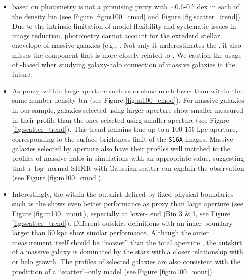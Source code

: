 \documentclass[a4paper,fleqn,usenatbib]{mnras}
\begin{document}
    \begin{itemize}

        \item \mstar{} based on \cmodel{} photometry is not a promising \mvir{} proxy with
            \sigmh{}$\sim 0.6$-0.7 dex in each of the density bin (see Figure \ref{fig:m100_cmod}
            and Figure \ref{fig:scatter_trend}).
            Due to the intrinsic limitation of model flexibility and systematic issues in
            image reduction, \cmodel{} photometry cannot account for the extedend stellar
            enevelope of massive galaxies (e.g., \citealt{Bernardi2013, Huang2018b}.
            Not only it underestimates the \mstar{}, it also misses the component that is
            more closely related to \mvir{}.
            We caution the usage of \cmodel{}-based \mstar{} when studying galaxy-halo
            connection of massive galaxies in the future.

        \item As \mvir{} proxy, \mstar{} within large aperture such as  or
             show much lower \sigmh{} than \mcmodel{} within the same number
            density bin (see Figure \ref{fig:m100_cmod}).
            For massive galaxies in our sample, galaxies selected using larger aperture \mstar{}
            show smaller \sigmh{} measured in their \dsigma{} profile than the ones
            selected using smaller aperture (see Figure \ref{fig:scatter_trend}).
            This trend remains true up to a 100-150 kpc aperture, corresponding to the
            surface brightness limit of the \texttt{S16A} images.
            Massive galaxies selected by aperture \mstar{} also have their \dsigma{}
            profiles well matched to the profiles of massive halos in simulations with an
            appropriate \sigmh{} value, suggesting that a $\log$-normal SHMR with Gaussian
            scatter can explain the observation (see Figure \ref{fig:m100_cmod}).

        \item Interestingly, the \mstar{} within the outskirt defined by fixed physical 
            boundaries such as the  shows even better performance as 
            \mvir{} proxy than large aperture \mstar{} (see Figure \ref{fig:m100_mout}),
            especially at lower-\mvir{} end (Bin 3 \& 4, see Figure \ref{fig:scatter_trend}).
            Different outskirt \mstar{} definitions with an inner boundary larger than 50 kpc
            show similar performance.
            Although the outer \mstar{} measurement itself should be ``noisier'' than the 
            total aperture \mstar{}, the outskirt of a massive galaxy is dominated by 
            the \exsitu{} stars with a closer relationship with \mvir{} or halo growth.
            The \dsigma{} profiles of  selected galaxies are also consistent 
            with the prediction of a ``scatter''--only model (see Figure \ref{fig:m100_mout}).
        

\end{itemize}
\end{document}
